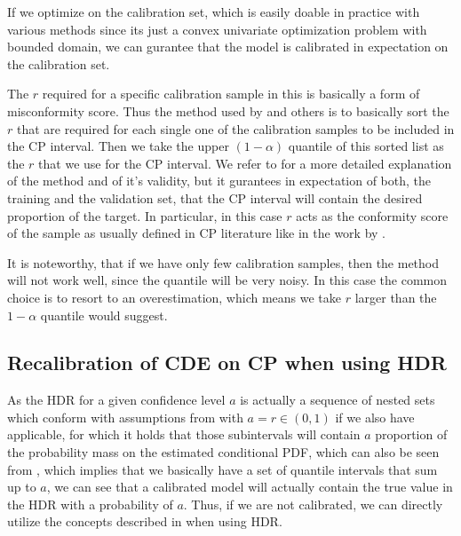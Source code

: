 If we optimize  on the calibration set, which is easily doable in practice with various methods since its just a convex univariate optimization problem with bounded domain, we can gurantee that the model is calibrated in expectation on the calibration set.

The $r$ required for a specific calibration sample in this  is basically a form of misconformity score. Thus the method used by \cite{sesia2021conformal, chernozhukov2021distributional} and others is to basically sort the $r$ that are required for each single one of the calibration samples to be included in the CP interval. Then we take the upper $(1- \alpha)$ quantile of this sorted list as the $r$ that we use for the CP interval. We refer to \cite{sesia2021conformal} for a more detailed explanation of the method and of it's validity, but it gurantees in expectation of both, the training and the validation set, that the CP interval will contain the desired proportion of the target. In particular, in this case $r$ acts as the conformity score of the sample as usually defined in CP literature like in the work by \cite{sesia2021conformal}.

It is noteworthy, that if we have only few calibration samples, then the method will not work well, since the quantile will be very noisy. In this case the common choice is to resort to an overestimation, which means we take $r$ larger than the $1-\alpha$ quantile would suggest.

\subsection{Recalibration of CDE on CP when using HDR}\label{sec:cp_sub_cde_hrd}

As the HDR for a given confidence level $a$ is actually a sequence of nested sets which conform with assumptions from  with $a = r \in (0,1)$ if we also have  applicable, for which it holds that those subintervals will contain $a$ proportion of the probability mass on the estimated conditional PDF, which can also be seen from , which implies that we basically have a set of quantile intervals that sum up to $a$, we can see that a calibrated model will actually contain the true value in the HDR with a probability of $a$. Thus, if we are not calibrated, we can directly utilize the concepts described in  when using HDR. 

